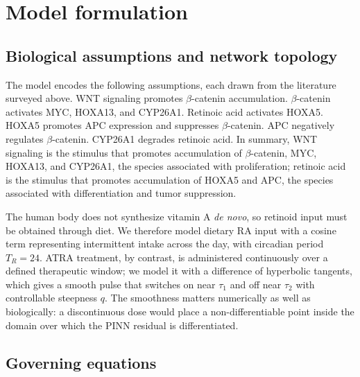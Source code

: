 \documentclass[11pt]{article}
\newcommand{\bcat}{$\beta$-\hspace{0pt}catenin}
\begin{document}
\section{Model formulation}
\label{sec:model}

\subsection{Biological assumptions and network topology}

The model encodes the following assumptions, each drawn from the literature
surveyed above. WNT signaling promotes \bcat{} accumulation. \bcat{} activates
MYC, HOXA13, and CYP26A1. Retinoic acid activates HOXA5. HOXA5 promotes APC
expression and suppresses \bcat{}. APC negatively regulates \bcat{}. CYP26A1
degrades retinoic acid. In summary, WNT signaling is the stimulus that promotes
accumulation of \bcat{}, MYC, HOXA13, and CYP26A1, the species associated with
proliferation; retinoic acid is the stimulus that promotes accumulation of
HOXA5 and APC, the species associated with differentiation and tumor
suppression.

The human body does not synthesize vitamin A \emph{de novo}, so retinoid input
must be obtained through diet. We therefore model dietary RA input with a
cosine term representing intermittent intake across the day, with circadian
period $T_R = 24$. ATRA treatment, by contrast, is administered continuously
over a defined therapeutic window; we model it with a difference of hyperbolic
tangents, which gives a smooth pulse that switches on near $\tau_1$ and off
near $\tau_2$ with controllable steepness $q$. The smoothness matters
numerically as well as biologically: a discontinuous dose would place a
non-differentiable point inside the domain over which the PINN residual is
differentiated.

\subsection{Governing equations}
\end{document}
